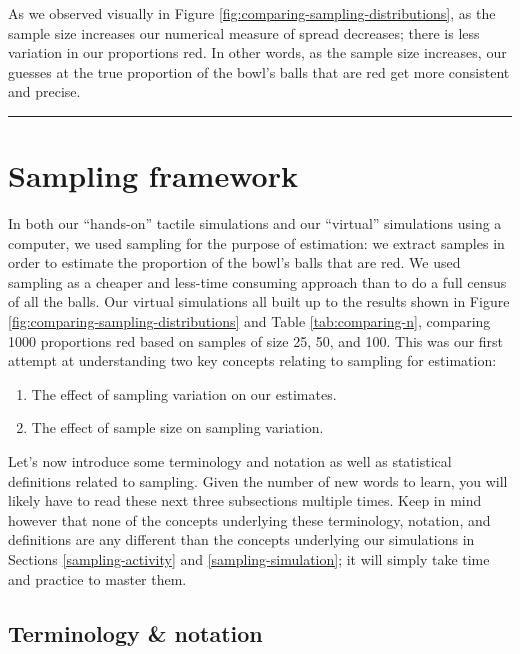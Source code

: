 \documentclass[12pt, krantz2,]{krantz}
\providecommand{\tightlist}{%
  \setlength{\itemsep}{0pt}\setlength{\parskip}{0pt}}
\begin{document}
As we observed visually in Figure \ref{fig:comparing-sampling-distributions}, as the sample size increases our numerical measure of spread decreases; there is less variation in our proportions red. In other words, as the sample size increases, our guesses at the true proportion of the bowl's balls that are red get more consistent and precise.

\begin{center}\rule{0.5\linewidth}{\linethickness}\end{center}

\hypertarget{sampling-framework}{%
\section{Sampling framework}\label{sampling-framework}}

In both our ``hands-on'' tactile simulations and our ``virtual'' simulations using a computer, we used sampling for the purpose of estimation: we extract samples in order to estimate the proportion of the bowl's balls that are red. We used sampling as a cheaper and less-time consuming approach than to do a full census of all the balls. Our virtual simulations all built up to the results shown in Figure \ref{fig:comparing-sampling-distributions} and Table \ref{tab:comparing-n}, comparing 1000 proportions red based on samples of size 25, 50, and 100. This was our first attempt at understanding two key concepts relating to sampling for estimation:

\begin{enumerate}
\def\labelenumi{\arabic{enumi}.}
\tightlist
\item
  The effect of sampling variation on our estimates.
\item
  The effect of sample size on sampling variation.
\end{enumerate}

Let's now introduce some terminology and notation as well as statistical definitions related to sampling. Given the number of new words to learn, you will likely have to read these next three subsections multiple times. Keep in mind however that none of the concepts underlying these terminology, notation, and definitions are any different than the concepts underlying our simulations in Sections \ref{sampling-activity} and \ref{sampling-simulation}; it will simply take time and practice to master them.

\hypertarget{terminology-and-notation}{%
\subsection{Terminology \& notation}\label{terminology-and-notation}}
\end{document}
